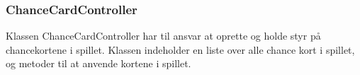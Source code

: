 \subsubsection{ChanceCardController}
Klassen ChanceCardController har til ansvar at oprette og holde styr på chancekortene i spillet. Klassen indeholder en liste over alle chance kort i spillet, og metoder til at anvende kortene i spillet. 